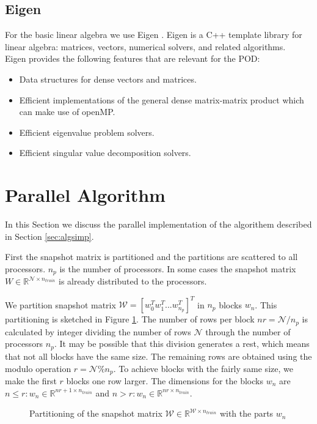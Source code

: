\subsection{Eigen}
For the basic linear algebra we use Eigen \cite*{eigenweb}. Eigen is a C++ template library for linear algebra: matrices, vectors, numerical solvers, and related algorithms.\\
Eigen provides the following features that are relevant for the POD:
\begin{itemize}
	\item Data structures for dense vectors and matrices.
	\item Efficient implementations of the general dense matrix-matrix product which can make use of openMP.
	\item Efficient eigenvalue problem solvers.
	\item Efficient singular value decomposition solvers.
\end{itemize}



\newpage

\section{Parallel Algorithm}
\label{sec:paralg}
In this Section we discuss the parallel implementation of the algorithem described in Section \ref{sec:algsimp}.

First the snapshot matrix is partitioned and the partitions are scattered to all processors. $n_p$ is the number of processors.
In some cases the snapshot matrix $W\in\mathbb{R}^{\mathcal{ N } \times n_{train}}$  is already distributed to the processors.

We partition snapshot matrix $\mathcal{W} = [w_0^T w_1^T ... w_{n_p}^T]^T$ in $n_p$ blocks $w_n$. This partitioning is sketched in Figure \ref{fig:Partitioning1}.
The number of rows per block $nr = \mathcal{ N } / n_p$ is calculated by integer dividing the number of rows $\mathcal{ N }$ through the number of processors $n_p$. 
It may be possible that this division generates a rest, which means that not all blocks have the same size.
The remaining rows are obtained using the modulo operation $r = \mathcal{ N } \% n_p$.
To achieve blocks with the fairly same size, we make the first $r$ blocks one row larger.
The dimensions for the blocks $w_n$ are $n\leq r: w_n \in \mathbb{R}^{nr+1 \times n_{train}}$ and  $n > r: w_n \in \mathbb{R}^{nr \times n_{train}}$.

\begin{figure}[H]
	\centering
	
	\caption[Partitioning snapshot satrix]{Partitioning of the snapshot matrix $\mathcal{W} \in \mathbb{R}^{\mathcal{ W }\times n_{train}}$ with the parts $w_n$}
	\label{fig:Partitioning1}
\end{figure}

